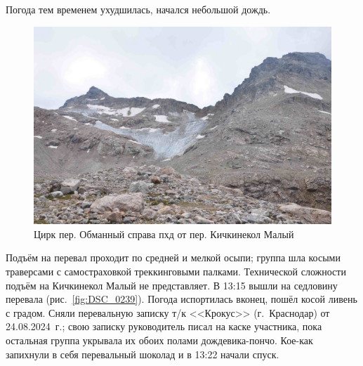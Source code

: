 Погода тем временем ухудшилась, начался небольшой дождь.


\begin{figure}[h!]
	\centering
	\includegraphics[width=0.7\linewidth]{../pics/DSC_0227.JPG}
	\caption{Цирк пер. Обманный справа пхд от пер. Кичкинекол Малый}
	\label{fig:DSC_0227}
\end{figure}


Подъём на перевал проходит по средней и мелкой осыпи; группа шла косыми траверсами с самостраховкой треккинговыми палками. Технической сложности подъём на Кичкинекол Малый не представляет.
В 13:15 вышли на седловину перевала (рис.~\ref{fig:DSC_0239}). Погода испортилась вконец, пошёл косой ливень с градом. Сняли перевальную записку т/к <<Крокус>> (г.~Краснодар) от 24.08.2024~г.; свою записку руководитель писал на каске участника, пока остальная группа укрывала их обоих полами дождевика-пончо. Кое-как запихнули в себя перевальный шоколад и в 13:22 начали спуск.


